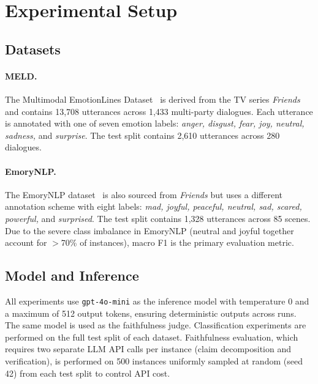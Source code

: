 \documentclass[runningheads]{llncs}
\begin{document}
\section{Experimental Setup}
\label{sec:setup}

\subsection{Datasets}

\paragraph{MELD.} The Multimodal EmotionLines Dataset~\cite{poria2019meld}
is derived from the TV series \textit{Friends} and contains 13{,}708
utterances across 1{,}433 multi-party dialogues. Each utterance is
annotated with one of seven emotion labels: \textit{anger, disgust,
fear, joy, neutral, sadness,} and \textit{surprise}. The test split
contains 2{,}610 utterances across 280 dialogues.

\paragraph{EmoryNLP.} The EmoryNLP dataset~\cite{zahiri2018emorynlp}
is also sourced from \textit{Friends} but uses a different annotation
scheme with eight labels: \textit{mad, joyful, peaceful, neutral, sad,
scared, powerful,} and \textit{surprised}. The test split contains
1{,}328 utterances across 85 scenes. Due to the severe class imbalance
in EmoryNLP (neutral and joyful together account for $>$70\% of
instances), macro F1 is the primary evaluation metric.

\subsection{Model and Inference}

All experiments use \texttt{gpt-4o-mini} as the inference model with
temperature 0 and a maximum of 512 output tokens, ensuring deterministic
outputs across runs. The same model is used as the faithfulness judge.
Classification experiments are performed on the full test split of each
dataset. Faithfulness evaluation, which requires two separate LLM API
calls per instance (claim decomposition and verification), is performed
on 500 instances uniformly sampled at random (seed 42) from each test
split to control API cost.
\end{document}
